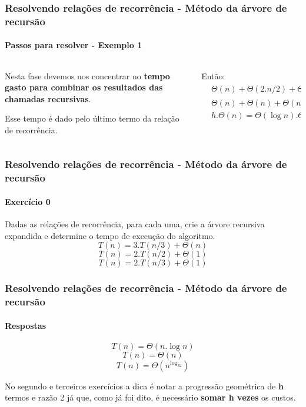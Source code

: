 \begin{frame}
	\frametitle{Resolvendo relações de recorrência - Método da árvore de recursão}
	\framesubtitle{Passos para resolver - Exemplo 1}
	\begin{columns}
		\begin{column}{0.35\textwidth}
			\par Nesta fase devemos nos concentrar no \textbf{tempo gasto para combinar os resultados das chamadas recursivas}.\newline
			\par Esse tempo é dado pelo último termo da relação de recorrência.
		\end{column}
		\begin{column}{0.65\textwidth}
			\par Então:
			\begin{equation}
				\begin{aligned}
					&\Theta(n) + \Theta(2.n/2) + \Theta(4.n/4) + \dots + \Theta(2^h . n/2^h) = \\
					&\Theta(n)+\Theta(n)+\Theta(n)+\dots+\Theta(n) = \mathbf{\Theta(n)} \implies \\
					&h . \Theta(n) = \Theta(\log n).\Theta(n) = \mathbf{\Theta(n.\log n)}
				\end{aligned}
			\end{equation}
		\end{column}
	\end{columns}
\end{frame}

\begin{frame}
	\frametitle{Resolvendo relações de recorrência - Método da árvore de recursão}
	\framesubtitle{Exercício 0}
	\par Dadas as relações de recorrência, para cada uma, crie a árvore recursiva expandida e determine o tempo de execução do algoritmo.
	\begin{equation}
		T(n) = 3.T(n/3) + \Theta(n)
	\end{equation}
	\begin{equation}
		T(n) = 2.T(n/2) + \Theta(1)
	\end{equation}
	\begin{equation}
		T(n) = 2.T(n/3) + \Theta(1)
	\end{equation}
\end{frame}

\begin{frame}
	\frametitle{Resolvendo relações de recorrência - Método da árvore de recursão}
	\framesubtitle{Respostas}
	\begin{equation}
		T(n) = \Theta(n.\log n)
	\end{equation}
	\begin{equation}
		T(n) = \Theta(n)
	\end{equation}
	\begin{equation}
		T(n) = \Theta(n^{\log_32})
	\end{equation}
	\par No segundo e terceiros exercícios a dica é notar a progressão geométrica de \textbf{h} termos e razão 2 já que, como já foi dito, é necessário \textbf{somar h vezes} os custos.
\end{frame}

